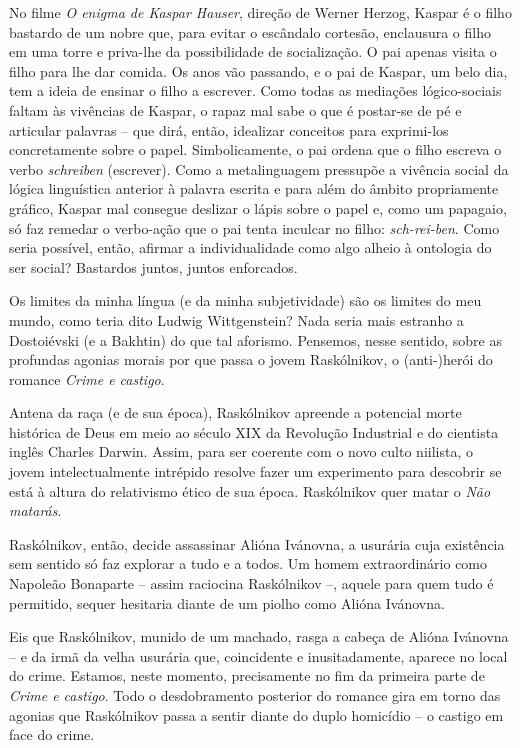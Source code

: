 No filme \emph{O enigma de Kaspar Hauser}, direção de Werner Herzog,
Kaspar é o filho bastardo de um nobre que, para evitar o escândalo
cortesão, enclausura o filho em uma torre e priva-lhe da possibilidade
de socialização. O pai apenas visita o filho para lhe dar comida. Os
anos vão passando, e o pai de Kaspar, um belo dia, tem a ideia de
ensinar o filho a escrever. Como todas as mediações lógico-sociais
faltam às vivências de Kaspar, o rapaz mal sabe o que é postar-se de pé
e articular palavras -- que dirá, então, idealizar conceitos para
exprimi-los concretamente sobre o papel. Simbolicamente, o pai ordena
que o filho escreva o verbo \emph{schreiben} (escrever). Como a
metalinguagem pressupõe a vivência social da lógica linguística anterior
à palavra escrita e para além do âmbito propriamente gráfico, Kaspar mal
consegue deslizar o lápis sobre o papel e, como um papagaio, só faz
remedar o verbo-ação que o pai tenta inculcar no filho:
\emph{sch-rei-ben}. Como seria possível, então, afirmar a
individualidade como algo alheio à ontologia do ser social? Bastardos
juntos, juntos enforcados.

Os limites da minha língua (e da minha subjetividade) são os limites do
meu mundo, como teria dito Ludwig Wittgenstein? Nada seria mais estranho
a Dostoiévski (e a Bakhtin) do que tal aforismo. Pensemos, nesse
sentido, sobre as profundas agonias morais por que passa o jovem
Raskólnikov, o (anti-)herói do romance \emph{Crime e castigo}.

Antena da raça (e de sua época), Raskólnikov apreende a potencial morte
histórica de Deus em meio ao século XIX da Revolução Industrial e do
cientista inglês Charles Darwin. Assim, para ser coerente com o novo
culto niilista, o jovem intelectualmente intrépido resolve fazer um
experimento para descobrir se está à altura do relativismo ético de sua
época. Raskólnikov quer matar o \emph{Não matarás}.

Raskólnikov, então, decide assassinar Alióna Ivánovna, a usurária cuja
existência sem sentido só faz explorar a tudo e a todos. Um homem
extraordinário como Napoleão Bonaparte -- assim raciocina Raskólnikov
--, aquele para quem tudo é permitido, sequer hesitaria diante de um
piolho como Alióna Ivánovna.

Eis que Raskólnikov, munido de um machado, rasga a cabeça de Alióna
Ivánovna -- e da irmã da velha usurária que, coincidente e
inusitadamente, aparece no local do crime. Estamos, neste momento,
precisamente no fim da primeira parte de \emph{Crime e castigo}. Todo o
desdobramento posterior do romance gira em torno das agonias que
Raskólnikov passa a sentir diante do duplo homicídio -- o castigo em
face do crime.


